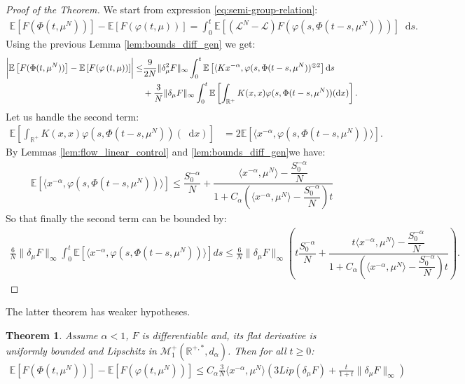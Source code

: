 \documentclass[11pt,a4paper]{article}
\newcommand{\RR}{\mathbb{R}}
\newcommand{\MC}{\mathcal{M}}
\newcommand{\LC}{\mathcal{L}}
\newcommand{\E}[1]{\mathbb{E}\left[#1\right]}
\newcommand{\dd}{\mathop{}\!\mathrm{d}}
\newtheorem{theorem}{Theorem}[section]
\begin{document}
\begin{proof}[Proof of the Theorem]
 We start from expression \eqref{eq:semi-group-relation}:
 \begin{align*}
\E{F(\Phi(t,\mu^N))} - \E{F(\varphi\left(t,\mu\right))} = \int_0^t \E{\left(\LC^N - \LC\right)F(\varphi(s,\Phi(t-s,\mu^N)))}\dd s.
\end{align*}
Using the previous Lemma \ref{lem:bounds_diff_gen} we get:
\begin{align*}
    \left|\vphantom{\dfrac{A}{A}} \E{F(\Phi(t,\mu^N))} - \E{F(\varphi\left(t,\mu\right))}\right| \leq&  \frac{9}{2N}\|\delta_\mu^2 F\|_{\infty}\int_0^t \E{ \langle Kx^{-\alpha} , \varphi(s,\Phi(t-s,\mu^N))^{\otimes 2}}\dd s\\
    &+ \frac{3}{N}\|\delta_\mu F\|_{\infty}\int_0^t\E{\int_{\RR^+} K(x,x)\varphi(s,\Phi(t-s,\mu^N))(\dd x)}.
\end{align*}
Let us handle the second term:
\begin{align*}
    \E{\int_{\RR^+} K(x,x)\varphi(s,\Phi(t-s,\mu^N))(\dd x)} 
    &=  2\E{\langle x^{-\alpha}, \varphi(s,\Phi(t-s,\mu^N))\rangle}.
\end{align*}
By Lemmas \ref{lem:flow_linear_control}  and \ref{lem:bounds_diff_gen}we have:
\begin{align*}
    \E{\langle x^{-\alpha}, \varphi(s,\Phi(t-s,\mu^N))\rangle} \leq \dfrac{S_0^{-\alpha}}{N} + \dfrac{\langle x^{-\alpha},\mu^N \rangle - \dfrac{S_0^{-\alpha}}{N}}{1 + C_\alpha \left(\langle x^{-\alpha},\mu^N \rangle - \dfrac{S_0^{-\alpha}}{N}\right)t}
\end{align*}
So that finally the second term can be bounded by:
\begin{multline*}
    \frac{6}{N}\|\delta_\mu F\|_{\infty}\int_0^t\E{\langle x^{-\alpha}, \varphi(s,\Phi(t-s,\mu^N))\rangle}ds \leq \frac{6}{N}\|\delta_\mu F\|_{\infty} \left( t\dfrac{S_0^{-\alpha}}{N} + \dfrac{t\langle x^{-\alpha},\mu^N \rangle - \dfrac{S_0^{-\alpha}}{N}}{1 + C_\alpha \left(\langle x^{-\alpha},\mu^N \rangle - \dfrac{S_0^{-\alpha}}{N}\right)t}\right).
\end{multline*}
\end{proof}


The latter theorem has weaker hypotheses.
\begin{theorem}
    Assume $\alpha < 1$, $F$ is differentiable and, its flat derivative is uniformly bounded and Lipschitz in $\MC^{+}_{1}\left(\RR^{+,*},d_\alpha\right)$. Then for all $t\geq 0$:
    \begin{align*}
        \E{F(\Phi(t,\mu^N))} - \E{F(\varphi\left(t,\mu^N\right))} \leq C_\alpha\frac{3}{N}\langle x^{-\alpha},\mu^N \rangle \left(3 Lip\left(\delta_\mu F\right) + \frac{t}{1 + t}\|\delta_\mu F\|_{\infty}\right)
    \end{align*}
\end{theorem}
\end{document}
